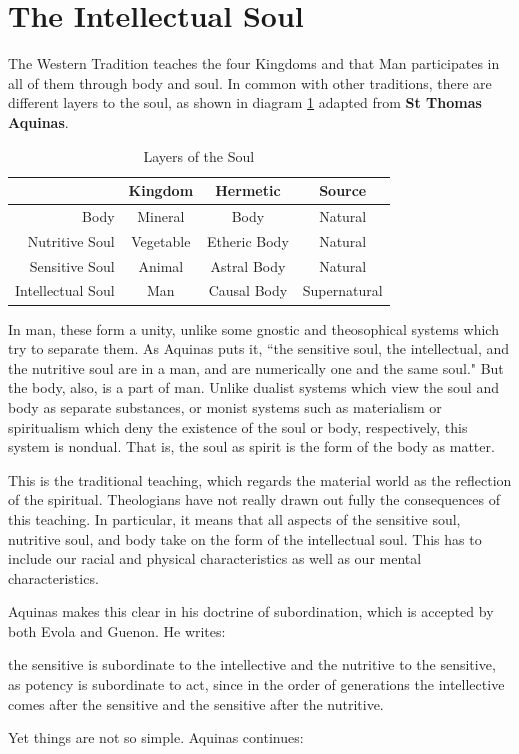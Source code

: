\section{The Intellectual Soul}

\label{sec:IntellectualSoul}

The Western Tradition teaches the four Kingdoms and that Man participates in all of them through body and soul. In common with other traditions, there are different layers to the soul, as shown in diagram \ref{tab:LayersSoul} adapted from \textbf{St Thomas Aquinas}.

\begin{table}[h]\centering
\begin{tabular}{rccc}\toprule\small
  &
\textbf{Kingdom} &
\textbf{Hermetic} &
\textbf{Source}\\\midrule
Body &
Mineral &
Body &
Natural\\
Nutritive Soul &
Vegetable &
Etheric Body &
Natural\\
Sensitive Soul &
Animal &
Astral Body &
Natural\\
Intellectual Soul &
Man &
Causal Body &
Supernatural\\\bottomrule
\end{tabular}
\caption{Layers of the Soul}
\label{tab:LayersSoul}
\end{table}
In man, these form a unity, unlike some gnostic and theosophical systems which try to separate them. As Aquinas puts it, ``the sensitive soul, the intellectual, and the nutritive soul are in a man, and are numerically one and the same soul." But the body, also, is a part of man. Unlike dualist systems which view the soul and body as separate substances, or monist systems such as materialism or spiritualism which deny the existence of the soul or body, respectively, this system is nondual. That is, the soul as spirit is the form of the body as matter.

This is the traditional teaching, which regards the material world as the reflection of the spiritual. Theologians have not really drawn out fully the consequences of this teaching. In particular, it means that all aspects of the sensitive soul, nutritive soul, and body take on the form of the intellectual soul. This has to include our racial and physical characteristics as well as our mental characteristics.

Aquinas makes this clear in his doctrine of subordination, which is accepted by both Evola and Guenon. He writes:

\begin{quotex}
the sensitive is subordinate to the intellective and the nutritive to the sensitive, as potency is subordinate to act, since in the order of generations the intellective comes after the sensitive and the sensitive after the nutritive. 

\end{quotex}
Yet things are not so simple. Aquinas continues:

